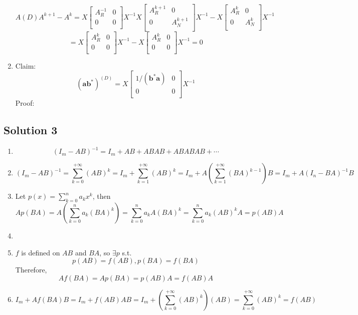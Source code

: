\documentclass{article}
\begin{document}
\begin{enumerate}
    \[A(D) A ^ {k + 1} - A ^ k = X \left[
    \begin{array}{cc}
     A_R ^ {-1} & 0 \\
     0 &  0 \\
    \end{array}
    \right]X^{-1} X\left[
    \begin{array}{cc}
     A_R ^ {k + 1} & 0 \\
     0 &  A_N ^ {k + 1}\\
    \end{array}
    \right]X^{-1} - X\left[
    \begin{array}{cc}
     A_R ^ {k } & 0 \\
     0 &  A_N ^ {k }\\
    \end{array}
    \right]X^{-1}\]
    \[ = X\left[
    \begin{array}{cc}
     A_R ^ {k } & 0 \\
     0 &  0\\
    \end{array}
    \right]X^{-1} - X\left[
    \begin{array}{cc}
     A_R ^ {k } & 0 \\
     0 &  0\\
    \end{array}
    \right]X^{-1} = 0\]
    \item Claim: 
    \[\mathbf{(ab^*)}^{(D)} = X\left[
    \begin{array}{cc}
     1/(\mathbf{b^*a}) & 0 \\
     0 &  0\\
    \end{array}
    \right]X^{-1}\]
    Proof:
    \[\]
\end{enumerate}
\subsection*{Solution 3}
\begin{enumerate}
    \item
    \[(I_m-AB)^{-1} = I_m+AB+ABAB+ABABAB+\cdots\]
    \item 
    \[(I_m-AB)^{-1}=\sum_{k=0}^{+\infty} (AB)^k = I_m+\sum_{k=1}^{+\infty}(AB)^k = I_m+A(\sum_{k=1}^{+\infty}(BA)^{k-1})B=I_m+A(I_n-BA)^{-1}B\]
    \item
    Let $p(x)=\sum_{k=0}^na_kx^k$, then
    \[Ap(BA)=A(\sum_{k=0}^na_k(BA)^k)=\sum_{k=0}^na_kA(BA)^k=\sum_{k=0}^na_k(AB)^kA = p(AB)A\]
    \item
    \item
    $f$ is defined on $AB$ and $BA$, so $\exists p$ s.t. 
    \[p(AB) = f(AB), p(BA)=f(BA)\]
    Therefore,
    \[Af(BA) = Ap(BA) = p(AB)A = f(AB)A\]
    \item
    \[I_m + Af(BA)B = I_m + f(AB)AB =I_m + (\sum_{k=0}^{+\infty} (AB)^k)(AB) = \sum_{k=0}^{+\infty} (AB)^k = f(AB) \]
\end{enumerate}
\end{document}

